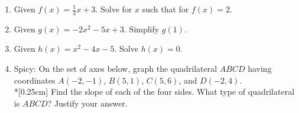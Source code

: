 \documentclass[12pt, twoside]{article}
\begin{document}
\begin{enumerate}
  \item Given $f(x)=\frac{1}{3} x+3$. Solve for $x$ such that for $f(x)=2$. \vspace{5cm}
  \item Given $g(x)=-2x^2-5x+3$. Simplify $g(1)$. \vspace{2cm}

\newpage
  \item Given $h(x)=x^2-4x-5$. Solve $h(x)=0$. \vspace{5cm}

  \item Spicy: On the set of axes below, graph the quadrilateral $ABCD$ having coordinates $A(-2,-1)$, $B(5,1)$, $C(5,6)$, and $D(-2,4)$. \\*[0.25cm]
  Find the slope of each of the four sides. What type of quadrilateral is $ABCD$? Justify your answer.
  \begin{flushright} %
  \end{flushright}

  \end{enumerate}
\end{document}

